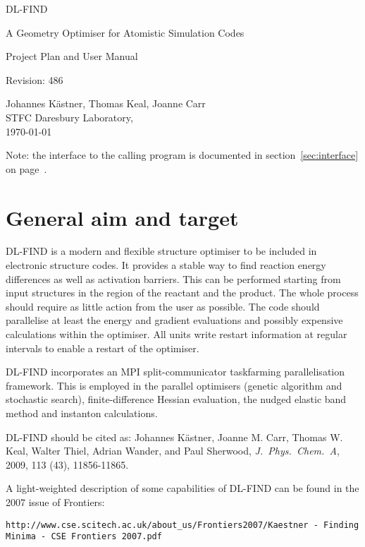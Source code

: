 \documentclass{article}
\begin{document}
\begin{center}
\LARGE
DL-FIND

\Large
A Geometry Optimiser for Atomistic Simulation Codes

\bigskip
\LARGE
Project Plan and User Manual

\bigskip
\normalsize    
$ $Revision: 486 $ $
 
Johannes K\"astner, Thomas Keal, Joanne Carr\\
STFC Daresbury Laboratory,\\
\today
\end{center}

Note: the interface to the calling program is documented in
section~\ref{sec:interface} on page~\pageref{sec:interface}.

\section{General aim and target}

DL-FIND is a modern and flexible structure optimiser to be included in
electronic structure codes. It provides a stable way to find reaction energy
differences as well as activation barriers. This can be performed starting
from input structures in the region of the reactant and the product.  The
whole process should require as little action from the user as possible.  The
code should parallelise at least the energy and gradient evaluations and
possibly expensive calculations within the optimiser. All units write restart
information at regular intervals to enable a restart of the optimiser.

DL-FIND incorporates an MPI split-communicator taskfarming 
parallelisation framework. This is employed in the parallel optimisers (genetic algorithm 
and stochastic search), finite-difference Hessian evaluation, the 
nudged elastic band method and instanton calculations.

DL-FIND should be cited as: Johannes K\"{a}stner, Joanne M. Carr, Thomas W. Keal, Walter Thiel, Adrian Wander, and Paul Sherwood,
\textit{J.~Phys.~Chem.~A}, 2009, 113 (43), 11856-11865.

A light-weighted description of some capabilities of DL-FIND can be found in
the 2007 issue of Frontiers: 

\texttt{http://www.cse.scitech.ac.uk/about\_us/Frontiers2007/Kaestner - Finding Minima - CSE Frontiers 2007.pdf}
\end{document}
